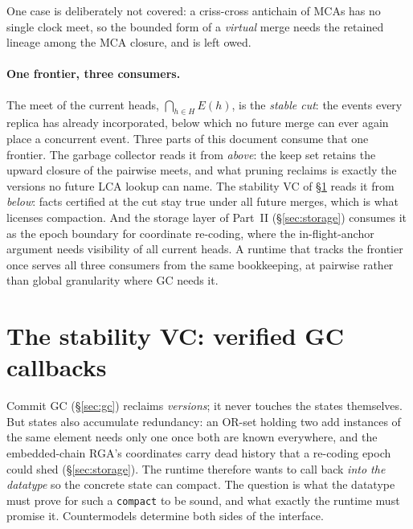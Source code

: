 \documentclass[11pt]{article}
\newcommand{\code}[1]{\texttt{#1}}
\begin{document}
One case
is deliberately not covered: a criss-cross antichain of MCAs has no
single clock meet, so the bounded form of a \emph{virtual} merge needs
the retained lineage among the MCA closure, and is left owed.

\paragraph{One frontier, three consumers.} The meet of the current
heads, $\bigcap_{h \in H} E(h)$, is the \emph{stable cut}: the events
every replica has already incorporated, below which no future merge can
ever again place a concurrent event. Three parts of this document
consume that one frontier. The garbage collector reads it from
\emph{above}: the keep set retains the upward closure of the pairwise
meets, and what pruning reclaims is exactly the versions no future LCA
lookup can name. The stability VC of \S\ref{sec:stability} reads it
from \emph{below}: facts certified at the cut stay true under all
future merges, which is what licenses compaction. And the storage layer
of Part~II (\S\ref{sec:storage}) consumes it as the epoch boundary for
coordinate re-coding, where the in-flight-anchor argument needs
visibility of all current heads. A runtime that tracks the frontier
once serves all three consumers from the same bookkeeping, at pairwise
rather than global granularity where GC needs it.

\section{The stability VC: verified GC callbacks}
\label{sec:stability}

Commit GC (\S\ref{sec:gc}) reclaims \emph{versions}; it never touches
the states themselves. But states also accumulate redundancy: an OR-set
holding two add instances of the same element needs only one once both
are known everywhere, and the embedded-chain RGA's coordinates carry
dead history that a re-coding epoch could shed (\S\ref{sec:storage}).
The runtime therefore wants to call back \emph{into the datatype} so
the concrete state can compact. The question is what the datatype must
prove for such a \code{compact} to be sound, and what exactly the
runtime must promise it. Countermodels determine both sides of the
interface.
\end{document}
